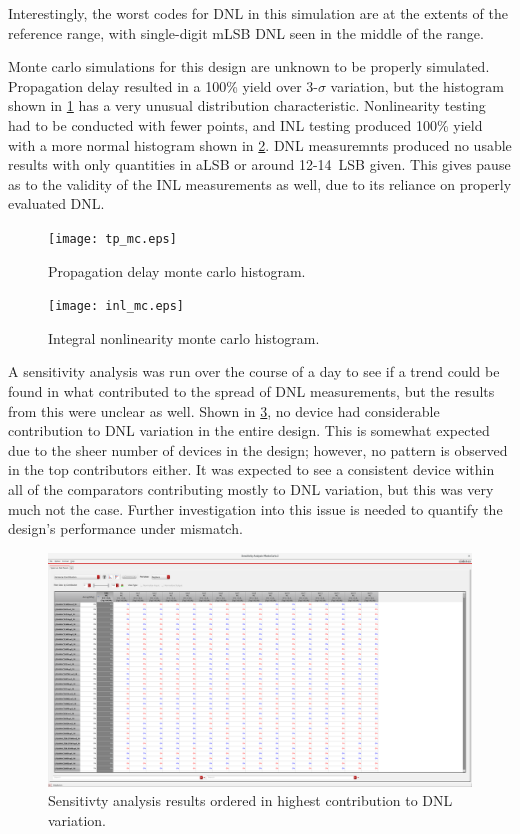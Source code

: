 \documentclass[11pt,letterpaper]{article}
\begin{document}
Interestingly, the worst codes for DNL in this simulation are at the extents of the reference range, with single-digit mLSB DNL seen in the middle of the range.

Monte carlo simulations for this design are unknown to be properly simulated. Propagation delay resulted in a 100\% yield over 3-\(\sigma\) variation, but the histogram shown in \cref{fig:tp_mc} has a very unusual distribution characteristic. Nonlinearity testing had to be conducted with fewer points, and INL testing produced 100\% yield with a more normal histogram shown in \cref{fig:inl_mc}. DNL measuremnts produced no usable results with only quantities in aLSB or around 12-\qty{14}{LSB} given. This gives pause as to the validity of the INL measurements as well, due to its reliance on properly evaluated DNL. 

\begin{figure}[ht!]
    \centering
    \texttt{[image: tp\_mc.eps]}
    \caption{Propagation delay monte carlo histogram.}\label{fig:tp_mc}
\end{figure}

\begin{figure}[ht!]
    \centering
    \texttt{[image: inl\_mc.eps]}
    \caption{Integral nonlinearity monte carlo histogram.}\label{fig:inl_mc}
\end{figure}

A sensitivity analysis was run over the course of a day to see if a trend could be found in what contributed to the spread of DNL measurements, but the results from this were unclear as well. Shown in \cref{fig:sens_dnl}, no device had considerable contribution to DNL variation in the entire design. This is somewhat expected due to the sheer number of devices in the design; however, no pattern is observed in the top contributors either. It was expected to see a consistent device within all of the comparators contributing mostly to DNL variation, but this was very much not the case. Further investigation into this issue is needed to quantify the design's performance under mismatch.

\begin{figure}[ht!]
    \centering
    \includegraphics[width=\textwidth]{sens_inl.png}
    \caption{Sensitivty analysis results ordered in highest contribution to DNL variation.}\label{fig:sens_dnl}
\end{figure}
\end{document}
